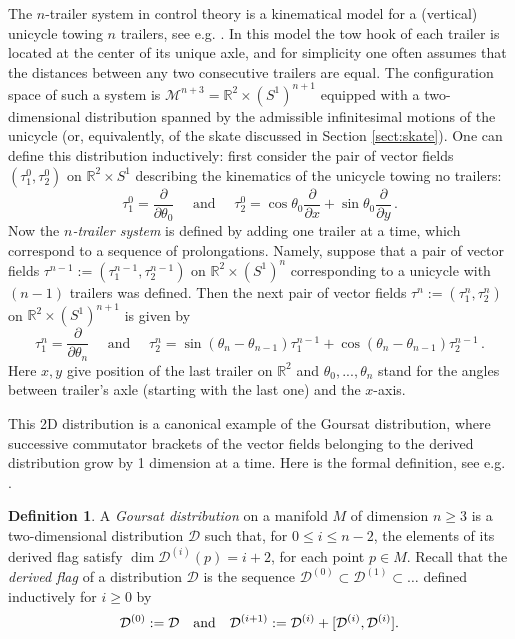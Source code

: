 \documentclass[11pt]{article}
\theoremstyle{definition}
\newtheorem{definition}[lemma]{Definition}
\newcounter{ai}
\begin{document}
The $n$-trailer system in control theory is a  kinematical model for a (vertical) unicycle towing $n$ trailers, see e.g. \cite{Jean1996, PasillasLepineRespondek2001, MONTGOMERY2001459}. In this model the tow hook of each trailer is located at the center of its unique axle, and for simplicity one often assumes that  the distances between any two consecutive trailers are equal. The configuration space of such a system is $\mathcal M^{n+3}=\mathbb R^2\times (S^1)^{n+1}$ equipped with a two-dimensional distribution spanned by the admissible infinitesimal 
motions of the unicycle (or, equivalently, of the skate discussed in Section \ref{sect:skate}).
One can define this distribution inductively: first consider the pair of vector fields $(\tau^0_1, \tau^0_2)$ on $\mathbb R^2\times S^1$ describing  the kinematics of the unicycle towing no trailers: 
$$
\tau^0_1=\frac{\partial}{\partial \theta_0}\quad \text{ and }\quad \tau^0_2=\cos\theta_0 \frac{\partial}{\partial x}+\sin \theta_0 \frac{\partial}{\partial y}\,.
$$
Now the {\it $n$-trailer system} is defined by adding one trailer at a time, which correspond to a sequence of prolongations.
Namely, suppose that a pair of vector fields $\tau^{n-1}:=(\tau^{n-1}_1, \tau^{n-1}_2) $ on
$\mathbb R^2\times (S^1)^{n}$ corresponding to a unicycle with $(n-1)$ trailers was defined. Then the next pair 
of vector fields $\tau^{n}:=(\tau^{n}_1, \tau^{n}_2) $ on
$\mathbb R^2\times (S^1)^{n+1}$ is given by
$$
\tau^n_1=\frac{\partial}{\partial \theta_n}\quad \text{ and }\quad \tau^n_2=\sin(\theta_n-\theta_{n-1})\tau^{n-1}_1+
\cos (\theta_n-\theta_{n-1}) \tau^{n-1}_2\,.
$$
Here $x,y$ give position of the last trailer on $\mathbb R^2$ and $\theta_0,..., \theta_n$ stand for the angles between trailer's axle (starting with the last one) and the $x$-axis.

This 2D distribution is a canonical example of the Goursat distribution, where successive commutator brackets of the vector fields belonging to the derived distribution grow by 1 dimension at a time. Here is the formal definition, see e.g. 
\cite{montgomery2002tour}.

\begin{definition}\label{def:Goursat}
A {\it Goursat distribution} on a manifold $M$ of dimension $n\ge 3$ is a  two-dimensional distribution $\mathcal D$ such
that, for $0\le i\le n-2$, the elements of its derived flag satisfy $\dim \mathcal D^{(i)}(p) = i+2$, for each point $p \in M$.
Recall that the {\it derived flag} of a distribution $\mathcal D$ is the sequence $\mathcal D^{(0)}\subset \mathcal D^{(1)}\subset \dots$ defined inductively for $ i\ge 0$ by 
$$
\mathcal D^{(0)}: = \mathcal D \quad {\rm and}\quad  \mathcal D^{(i+1) }:= \mathcal D^{(i)} + [\mathcal D^{(i)}, \mathcal D^{(i)}].
$$
\end{definition}
\end{document}
